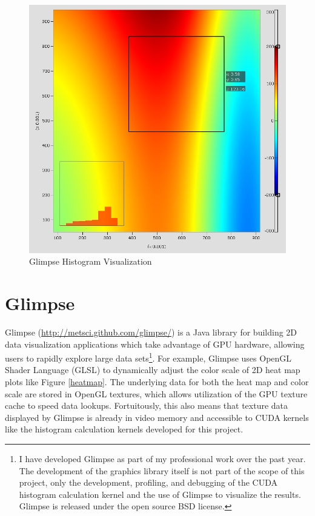 \documentclass{article}
\begin{document}
\begin{figure}
\centering
\includegraphics[width=1.0\textwidth]{screenshots/glimpse/GlimpseHistogramPlot.png}
\caption{Glimpse Histogram Visualization}
\label{histogram1}
\end{figure}

\section{Glimpse}\label{glimpse}

Glimpse (\url{http://metsci.github.com/glimpse/}) is a Java library for building 2D data visualization applications which take advantage of GPU hardware, allowing users to rapidly explore large data sets\footnote{I have developed Glimpse as part of my professional work over the past year. The development of the graphics library itself is not part of the scope of this project, only the development, profiling, and debugging of the CUDA histogram calculation kernel and the use of Glimpse to visualize the results. Glimpse is released under the open source BSD license.}. For example, Glimpse uses OpenGL Shader Language (GLSL) to dynamically adjust the color scale of 2D heat map plots like Figure \ref{heatmap}. The underlying data for both the heat map and color scale are stored in OpenGL textures, which allows utilization of the GPU texture cache to speed data lookups. Fortuitously, this also means that texture data displayed by Glimpse is already in video memory and accessible to CUDA kernels like the histogram calculation kernels developed for this project.
\end{document}
